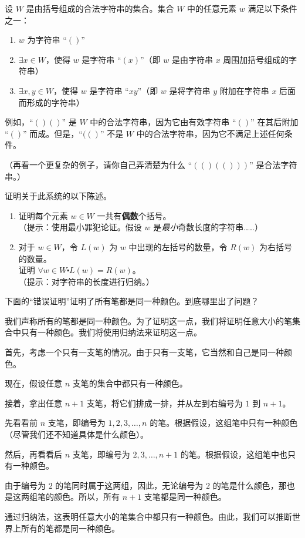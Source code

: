 \begin{exercise}
    设 $W$ 是由括号组成的合法字符串的集合。集合 $W$ 中的任意元素 $w$ 满足以下条件之一：
    \begin{enumerate}[i]
        \item $w$ 为字符串 ``$()$''
        \item $\exists x \in W$，使得 $w$ 是字符串 ``$(x)$''（即 $w$ 是由字符串 $x$ 周围加括号组成的字符串）
        \item $\exists x, y \in W$，使得 $w$ 是字符串 ``$xy$''（即 $w$ 是将字符串 $y$ 附加在字符串 $x$ 后面而形成的字符串）
    \end{enumerate}
    例如，``$()()$'' 是 $W$ 中的合法字符串，因为它由有效字符串 ``$()$'' 在其后附加 ``$()$'' 而成。但是，``$(( )$'' 不是 $W$ 中的合法字符串，因为它不满足上述任何条件。

    （再看一个更复杂的例子，请你自己弄清楚为什么 ``$(()(()))$'' 是合法字符串。）

    证明关于此系统的以下陈述。
    \begin{enumerate}[label=(\alph*)]
        \item 证明每个元素 $w \in W$ 一共有\textbf{偶数}个括号。\\
        （提示：使用最小罪犯论证。假设 $w$ 是\emph{最小}奇数长度的字符串……）
        \item 对于 $w \in W$，令 $L(w)$ 为 $w$ 中出现的左括号的数量，令 $R(w)$ 为右括号的数量。\\
        证明 $\forall w \in W \centerdot L(w) = R(w)$。\\
        （提示：对字符串的长度进行归纳。）
    \end{enumerate}
\end{exercise}

\begin{exercise}
    下面的``错误证明''证明了所有笔都是同一种颜色。到底哪里出了问题？

    \begin{spoof}
        我们声称所有的笔都是同一种颜色。为了证明这一点，我们将证明任意大小的笔集合中只有一种颜色。我们将使用归纳法来证明这一点。

        首先，考虑一个只有一支笔的情况。由于只有一支笔，它当然和自己是同一种颜色。

        现在，假设任意 $n$ 支笔的集合中都只有一种颜色。

        接着，拿出任意 $n+1$ 支笔，将它们排成一排，并从左到右编号为 $1$ 到 $n + 1$。

        先看看前 $n$ 支笔，即编号为 $1,2,3, \dots ,n$ 的笔。根据假设，这组笔中只有一种颜色（尽管我们还不知道具体是什么颜色）。

        然后，再看看后 $n$ 支笔，即编号为 $2,3, \dots ,n+1$ 的笔。根据假设，这组笔中也只有一种颜色。

        由于编号为 $2$ 的笔同时属于这两组，因此，无论编号为 $2$ 的笔是什么颜色，那也是这两组笔的颜色。所以，所有 $n + 1$ 支笔都是同一种颜色。

        通过归纳法，这表明任意大小的笔集合中都只有一种颜色。由此，我们可以推断世界上所有的笔都是同一种颜色。
    \end{spoof}
\end{exercise}

